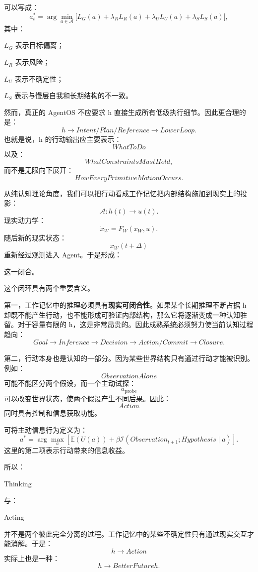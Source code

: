 可以写成：
\[
a_t^*
=
\arg\min_{a\in\mathcal A}
\Big[
L_G(a)
+
\lambda_RL_R(a)
+
\lambda_UL_U(a)
+
\lambda_SL_S(a)
\Big],
\]
其中：

$L_G$ 表示目标偏离；

$L_R$ 表示风险；

$L_U$ 表示不确定性；

$L_S$ 表示与慢层自我和长期结构的不一致。

然而，真正的 AgentOS 不应要求 h 直接生成所有低级执行细节。因此更合理的是：
\[
h
\rightarrow
Intent/Plan/Reference
\rightarrow
LowerLoop.
\]
也就是说，h 的行动输出应主要表示：
\[
WhatToDo
\]
以及：
\[
WhatConstraintsMustHold,
\]
而不是无限向下展开：
\[
HowEveryPrimitiveMotionOccurs.
\]

从纯认知理论角度，我们可以把行动看成工作记忆把内部结构施加到现实上的投影：
\[
\mathcal A:
h(t)
\rightarrow
u(t).
\]
现实动力学：
\[
\dot x_W
=
F_W(x_W,u).
\]
随后新的现实状态：
\[
x_W(t+\Delta)
\]
重新经过观测进入 Agent。于是形成：
\begin{statementbox}
\centering
{}
\end{statementbox}
这一闭合。

这个闭环具有两个重要含义。

第一，工作记忆中的推理必须具有\textbf{现实可闭合性}。如果某个长期推理不断占据 h 却既不能产生行动，也不能形成可验证内部结构，那么它将逐渐变成一种认知驻留。对于容量有限的 h，这是非常昂贵的。因此成熟系统必须努力使当前认知过程趋向：
\[
Goal
\rightarrow
Inference
\rightarrow
Decision
\rightarrow
Action/Commit
\rightarrow
Closure.
\]

第二，行动本身也是认知的一部分。因为某些世界结构只有通过行动才能被识别。例如：
\[
ObservationAlone
\]
可能不能区分两个假设，而一个主动试探：
\[
a_{\mathrm{probe}}
\]
可以改变世界状态，使两个假设产生不同后果。因此：
\[
Action
\]
同时具有控制和信息获取功能。

可将主动信息行为定义为：
\[
a^*
=
\arg\max_a
\left[
\mathbb E(U(a))
+
\beta
\mathcal I
\left(
Observation_{t+1};
Hypothesis
\mid a
\right)
\right].
\]
这里的第二项表示行动带来的信息收益。

所以：
\begin{statementbox}
Thinking
\end{statementbox}
与：
\begin{statementbox}
Acting
\end{statementbox}
并不是两个彼此完全分离的过程。工作记忆中的某些不确定性只有通过现实交互才能消解。于是：
\[
h\rightarrow Action
\]
实际上也是一种：
\[
h\rightarrow BetterFutureh.
\]

